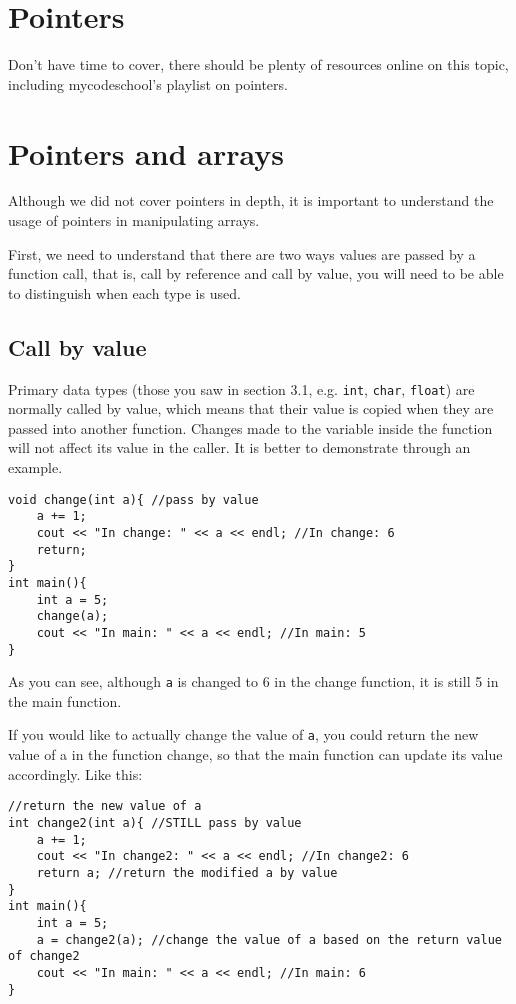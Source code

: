 \section{Pointers}

Don't have time to cover, there should be plenty of resources online on this topic, including mycodeschool's playlist on pointers.

\section{Pointers and arrays}

Although we did not cover pointers in depth, it is important to understand the usage of pointers in manipulating arrays. 

First, we need to understand that there are two ways values are passed by a function call, that is, call by reference and call by value, you will need to be able to distinguish when each type is used.

\subsection{Call by value}

Primary data types (those you saw in section 3.1, e.g. \texttt{int}, \texttt{char}, \texttt{float}) are normally called by value, which means that their value is copied when they are passed into another function. Changes made to the variable inside the function will not affect its value in the caller. It is better to demonstrate through an example.

\begin{lstlisting}
void change(int a){ //pass by value
    a += 1;
    cout << "In change: " << a << endl; //In change: 6
    return;
}
int main(){
    int a = 5;
    change(a);
    cout << "In main: " << a << endl; //In main: 5
}
\end{lstlisting}

As you can see, although \texttt{a} is changed to 6 in the change function, it is still 5 in the main function. 
\vspace{6mm}

If you would like to actually change the value of \texttt{a}, you could return the new value of a in the function change, so that the main function can update its value accordingly. Like this:

\begin{lstlisting}
//return the new value of a
int change2(int a){ //STILL pass by value
    a += 1;
    cout << "In change2: " << a << endl; //In change2: 6
    return a; //return the modified a by value
}
int main(){
    int a = 5;
    a = change2(a); //change the value of a based on the return value of change2
    cout << "In main: " << a << endl; //In main: 6
}
\end{lstlisting}

